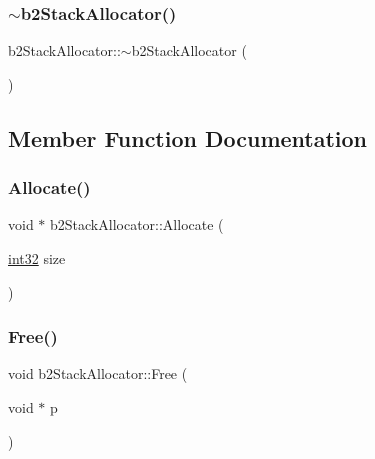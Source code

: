 \mbox{\label{classb2_stack_allocator_a9f9bd23569d3521316d2f00b1de454b2}} 
\subsubsection{\texorpdfstring{$\sim$b2StackAllocator()}{~b2StackAllocator()}}
{\footnotesize\ttfamily b2\+Stack\+Allocator\+::$\sim$b2\+Stack\+Allocator (\begin{DoxyParamCaption}{ }\end{DoxyParamCaption})}



\subsection{Member Function Documentation}
\mbox{\label{classb2_stack_allocator_a4b8c515d8e1a1c2d5b151c3a2f96fa19}} 
\subsubsection{\texorpdfstring{Allocate()}{Allocate()}}
{\footnotesize\ttfamily void $\ast$ b2\+Stack\+Allocator\+::\+Allocate (\begin{DoxyParamCaption}\item[{\mbox{\hyperlink{b2_settings_8h_a43d43196463bde49cb067f5c20ab8481}{int32}}}]{size }\end{DoxyParamCaption})}

\mbox{\label{classb2_stack_allocator_a3a4384cf5f467828db3022985673db66}} 
\subsubsection{\texorpdfstring{Free()}{Free()}}
{\footnotesize\ttfamily void b2\+Stack\+Allocator\+::\+Free (\begin{DoxyParamCaption}\item[{void $\ast$}]{p }\end{DoxyParamCaption})}

